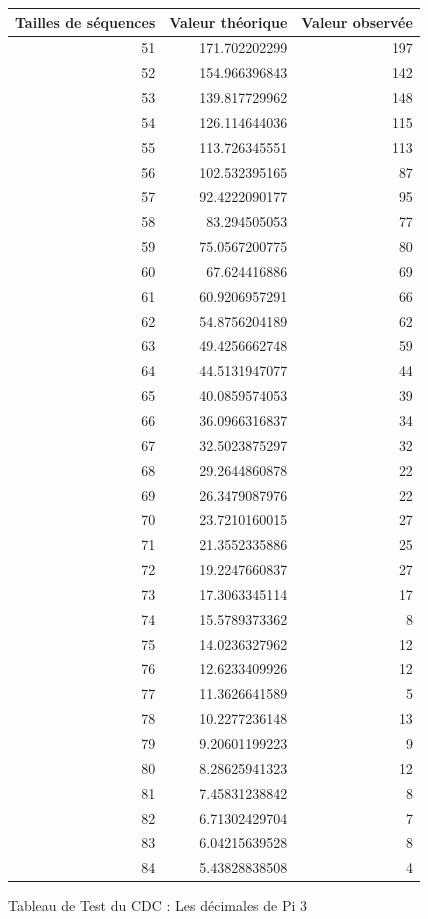 \documentclass[french]{article}
\begin{document}
\newpage
\begin{figure}[h!]
	\centering
	\begin{tabular}{|r|r|r|}
		\hline
		Tailles de séquences & Valeur théorique & Valeur observée\\
		\hline
		51 & 171.702202299 & 197\\
		52 & 154.966396843 & 142\\
		53 & 139.817729962 & 148\\
		54 & 126.114644036 & 115\\
		55 & 113.726345551 & 113\\
		56 & 102.532395165 & 87\\
		57 & 92.4222090177 & 95\\
		58 & 83.294505053 & 77\\
		59 & 75.0567200775 & 80\\
		60 & 67.624416886 & 69\\
		61 & 60.9206957291 & 66\\
		62 & 54.8756204189 & 62\\
		63 & 49.4256662748 & 59\\
		64 & 44.5131947077 & 44\\
		65 & 40.0859574053 & 39\\
		66 & 36.0966316837 & 34\\
		67 & 32.5023875297 & 32\\
		68 & 29.2644860878 & 22\\
		69 & 26.3479087976 & 22\\
		70 & 23.7210160015 & 27\\
		71 & 21.3552335886 & 25\\
		72 & 19.2247660837 & 27\\
		73 & 17.3063345114 & 17\\
		74 & 15.5789373362 & 8\\
		75 & 14.0236327962 & 12\\
		76 & 12.6233409926 & 12\\
		77 & 11.3626641589 & 5\\
		78 & 10.2277236148 & 13\\
		79 & 9.20601199223 & 9\\
		80 & 8.28625941323 & 12\\
		81 & 7.45831238842 & 8\\
		82 & 6.71302429704 & 7\\
		83 & 6.04215639528 & 8\\
		84 & 5.43828838508 & 4\\
		\hline
	\end{tabular}
	\caption{Tableau de Test du CDC : Les décimales de Pi 3}
\end{figure}
\end{document}
